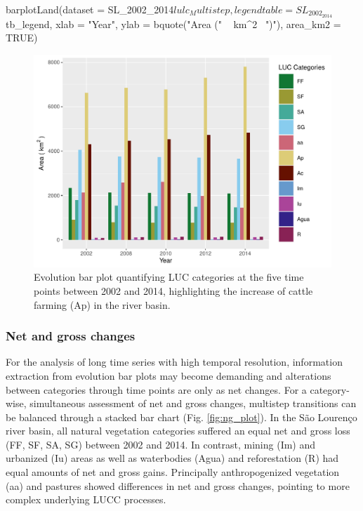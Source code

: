 \begin{Schunk}
\begin{Sinput}
barplotLand(dataset = SL_2002_2014$lulc_Multistep, 
            legendtable = SL_2002_2014$tb_legend,
            xlab = "Year",
            ylab = bquote("Area (" ~ km^2~ ")"),
            area_km2 = TRUE)
\end{Sinput}
\begin{figure}[htbp]

{\centering \includegraphics[width=1\linewidth,trim={0 0.2cm 0 0.2cm},clip]{figures/barplotLand.pdf} 

}

\caption[LUC evolution Bar Plot 2002 – 2014]{Evolution bar plot quantifying LUC categories at the five time points between 2002 and 2014, highlighting the increase of cattle farming (Ap) in the river basin.}\label{fig:evolution_plot}
\end{figure}
\end{Schunk}

\hypertarget{net-and-gross-changes}{%
\subsubsection{Net and gross changes}\label{net-and-gross-changes}}

For the analysis of long time series with high temporal resolution,
information extraction from evolution bar plots may become demanding and
alterations between categories through time points are only as net
changes. For a category-wise, simultaneous assessment of net and gross
changes, multistep transitions can be balanced through a stacked bar
chart (Fig. \ref{fig:ng_plot}). In the São Lourenço river basin, all
natural vegetation categories suffered an equal net and gross loss (FF,
SF, SA, SG) between 2002 and 2014. In contrast, mining (Im) and
urbanized (Iu) areas as well as waterbodies (Agua) and reforestation (R)
had equal amounts of net and gross gains. Principally anthropogenized
vegetation (aa) and pastures showed differences in net and gross
changes, pointing to more complex underlying LUCC processes.

